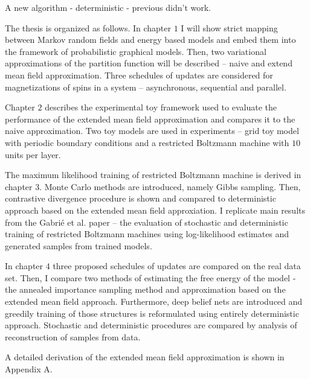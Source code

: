 A new algorithm - deterministic - previous didn't work.\cite{gabrie2015training}

The thesis is organized as follows. In chapter $1$ I will show strict mapping between Markov random fields and energy based models and embed them into the framework of probabilistic graphical models. Then, two variational approximations of the partition function will be described -- naive and extend mean field approximation. Three schedules of updates are considered for magnetizations of spins in a system -- asynchronous, sequential and parallel. 

Chapter $2$ describes the experimental toy framework used to evaluate the performance of the extended mean field approximation and compares it to the naive approximation. Two toy models are used in experiments -- grid toy model with periodic boundary conditions and a restricted Boltzmann machine with $10$ units per layer. 

The maximum likelihood training of restricted Boltzmann machine is derived in chapter $3$. Monte Carlo methods are introduced, namely Gibbs sampling. Then, contrastive divergence procedure is shown and compared to deterministic approach based on the extended mean field approxiation. I replicate main results from the Gabri\'e et al. paper -- the evaluation of stochastic and deterministic training of restricted Boltzmann machines using log-likelihood estimates and generated samples from trained models.

In chapter $4$ three proposed schedules of updates are compared on the real data set. Then, I compare two methods of estimating the free energy of the model - the annealed importance sampling method and approximation based on the extended mean field approach.
Furthermore, deep belief nets are introduced and greedily training of those structures is reformulated using entirely deterministic approach. Stochastic and deterministic procedures are compared by analysis of reconstruction of samples from data.

A detailed derivation of the extended mean field approximation is shown in Appendix A.
